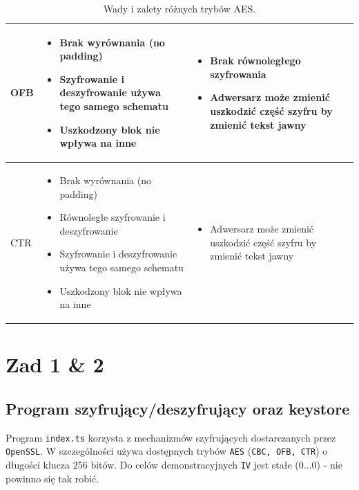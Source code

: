 \documentclass[a4paper,11pt]{article}
\theoremstyle{mytheor}
\begin{document}
\begin{table}[]
\begin{tabular}{|p{}|p{}|p{}|}
        OFB & \begin{itemize}
            \setlength\itemsep{-0.5em}
            \item Brak wyrównania (no padding)
            \item Szyfrowanie i deszyfrowanie używa tego samego schematu
            \item Uszkodzony blok nie wpływa na inne
        \end{itemize} & \begin{itemize}
            \setlength\itemsep{-0.8em}
            \item Brak równoległego szyfrowania
            \item Adwersarz może zmienić uszkodzić część szyfru by zmienić tekst jawny
        \end{itemize}
        \\ \hline
        
        CTR & \begin{itemize}
            \setlength\itemsep{-0.5em}
            \item Brak wyrównania (no padding)
            \item Równoległe szyfrowanie i deszyfrowanie
            \item Szyfrowanie i deszyfrowanie używa tego samego schematu
            \item Uszkodzony blok nie wpływa na inne
        \end{itemize} & \begin{itemize}
            \setlength\itemsep{-0.8em}
            \item Adwersarz może zmienić uszkodzić część szyfru by zmienić tekst jawny
        \end{itemize}
        \\ \hline
    \end{tabular}
    \caption{Wady i zalety różnych trybów AES.}
    \label{tab:aesmodes}
\end{table}

\section*{Zad 1 \& 2}
\subsection*{Program szyfrujący/deszyfrujący oraz keystore}
Program \texttt{index.ts} korzysta z mechanizmów szyfrujących dostarczanych przez \texttt{OpenSSL}. W szczególności używa dostępnych trybów \texttt{AES} (\texttt{CBC, OFB, CTR}) o długości klucza $256$ bitów. Do celów demonstracyjnych \texttt{IV} jest stałe ($0...0$) - nie powinno się tak robić.
\end{document}

